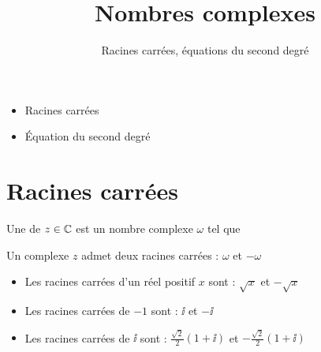 









\title{{\bf Nombres complexes}}
\subtitle{Racines carr\'ees, \'equations du second degr\'e}


\begin{frame}
  
  \debutmontitre

  \pause

{\footnotesize
\hfill
{}
\begin{minipage}{0.6\textwidth}
  \begin{itemize}
    \item<3-> Racines carrées 
    \item<4-> Équation du second degré
  \end{itemize}
\end{minipage}
}
\vspace*{1cm}
\end{frame}

\setcounter{framenumber}{0}



\section{Racines carr\'ees}

\begin{frame}

Une  de $z\in \mathbb{C}$ est un nombre complexe $\omega$ tel que

\pause

Un complexe $z$ admet deux racines carrées : $\omega$ et $-\omega$

\pause
\bigskip
\begin{exemple}
\begin{itemize}
\item Les racines carrées d'un réel positif $x$ sont : $\sqrt{x}$ et $-\sqrt{x}$
\pause
\item Les racines carrées de $-1$ sont : $\ii$ et $-\ii$
\pause
\item Les racines carrées de $\ii$ sont : $\frac{\sqrt{2}}{2}(1+\ii)$ et $-\frac{\sqrt{2}}{2}(1+\ii)$
\end{itemize}
\end{exemple}


\end{frame}


